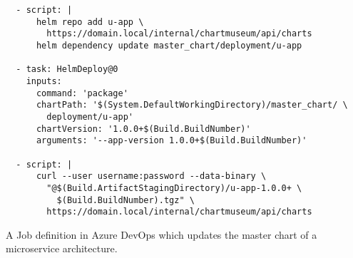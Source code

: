 \begin{longlisting}
\begin{verbatim}
  - script: |
      helm repo add u-app \
        https://domain.local/internal/chartmuseum/api/charts
      helm dependency update master_chart/deployment/u-app

  - task: HelmDeploy@0
    inputs:
      command: 'package'
      chartPath: '$(System.DefaultWorkingDirectory)/master_chart/ \
        deployment/u-app'
      chartVersion: '1.0.0+$(Build.BuildNumber)'
      arguments: '--app-version 1.0.0+$(Build.BuildNumber)'

  - script: |
      curl --user username:password --data-binary \
        "@$(Build.ArtifactStagingDirectory)/u-app-1.0.0+ \
          $(Build.BuildNumber).tgz" \
        https://domain.local/internal/chartmuseum/api/charts
  \end{verbatim}
  \caption{A Job definition in Azure DevOps which updates the master chart of a
  microservice architecture.}%
  \label{listing:azure_devops_build_master_chart_job}
\end{longlisting}
